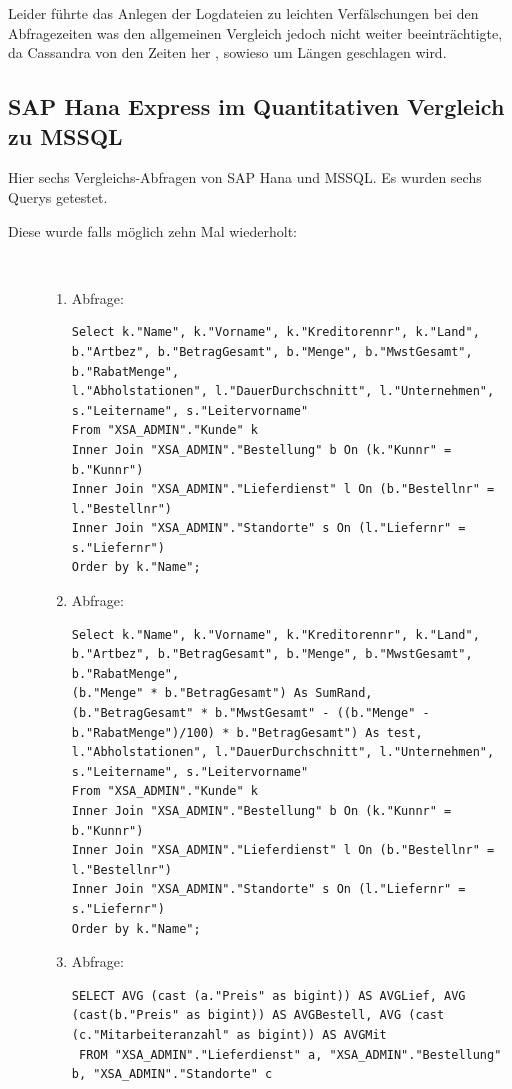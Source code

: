 \documentclass[a4paper, 12pt]{scrartcl}
\begin{document}
Leider führte das Anlegen der Logdateien zu leichten Verfälschungen bei den Abfragezeiten was den allgemeinen Vergleich jedoch nicht weiter beeinträchtigte, da Cassandra von den Zeiten her , sowieso um Längen geschlagen wird.
\subsection{SAP Hana Express im Quantitativen Vergleich zu MSSQL}
Hier sechs Vergleichs-Abfragen von SAP Hana und MSSQL. Es wurden  sechs Querys getestet. 
\begin{description}
	\item[Diese wurde falls möglich zehn Mal wiederholt:]~\par 
	\begin{enumerate}
		\item Abfrage: 
		\begin{verbatim}
Select k."Name", k."Vorname", k."Kreditorennr", k."Land", 
b."Artbez", b."BetragGesamt", b."Menge", b."MwstGesamt", b."RabatMenge", 
l."Abholstationen", l."DauerDurchschnitt", l."Unternehmen",
s."Leitername", s."Leitervorname"
From "XSA_ADMIN"."Kunde" k 
Inner Join "XSA_ADMIN"."Bestellung" b On (k."Kunnr" = b."Kunnr")
Inner Join "XSA_ADMIN"."Lieferdienst" l On (b."Bestellnr" = l."Bestellnr")
Inner Join "XSA_ADMIN"."Standorte" s On (l."Liefernr" = s."Liefernr")
Order by k."Name"; 
		\end{verbatim}
		\item Abfrage: 
		\begin{verbatim}
Select k."Name", k."Vorname", k."Kreditorennr", k."Land", 
b."Artbez", b."BetragGesamt", b."Menge", b."MwstGesamt", b."RabatMenge", 
(b."Menge" * b."BetragGesamt") As SumRand,
(b."BetragGesamt" * b."MwstGesamt" - ((b."Menge" - b."RabatMenge")/100) * b."BetragGesamt") As test,
l."Abholstationen", l."DauerDurchschnitt", l."Unternehmen",
s."Leitername", s."Leitervorname"
From "XSA_ADMIN"."Kunde" k 
Inner Join "XSA_ADMIN"."Bestellung" b On (k."Kunnr" = b."Kunnr")
Inner Join "XSA_ADMIN"."Lieferdienst" l On (b."Bestellnr" = l."Bestellnr")
Inner Join "XSA_ADMIN"."Standorte" s On (l."Liefernr" = s."Liefernr")
Order by k."Name";
		\end{verbatim}
		\item Abfrage: 
		\begin{verbatim}
SELECT AVG (cast (a."Preis" as bigint)) AS AVGLief, AVG (cast(b."Preis" as bigint)) AS AVGBestell, AVG (cast (c."Mitarbeiteranzahl" as bigint)) AS AVGMit 
 FROM "XSA_ADMIN"."Lieferdienst" a, "XSA_ADMIN"."Bestellung" b, "XSA_ADMIN"."Standorte" c

\end{verbatim}
\end{enumerate}
\end{description}
\end{document}
